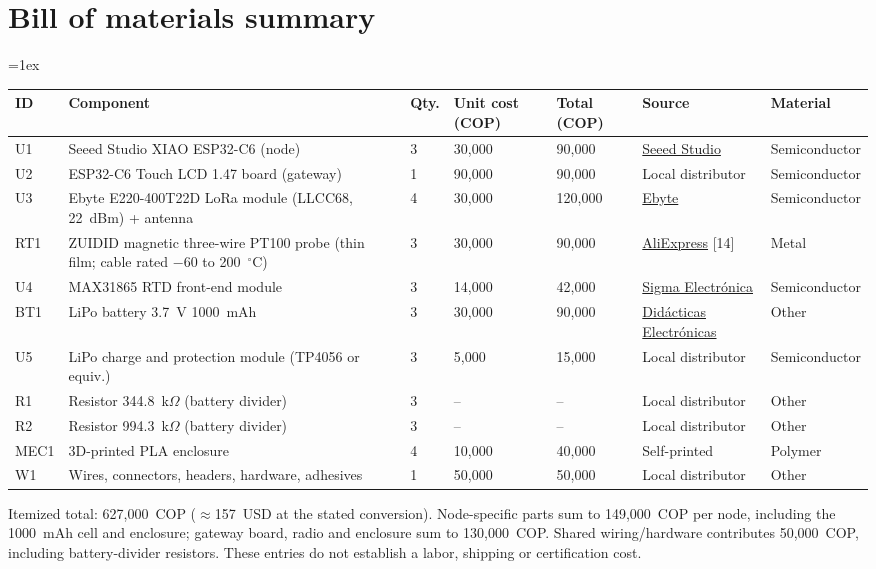 \documentclass[11pt, letterpaper]{article}
\begin{document}
\section{Bill of materials summary}
\vskip 0.2cm
\begingroup\small
\tabulinesep=1ex
\begin{tabu} to \linewidth {|X[0.8,l]|X[1.6,l]|X[0.4,c]|X[0.9,r]|X[0.9,r]|X[1.2,l]|X[1.1,l]|}
\hline
\textbf{ID} & \textbf{Component} & \textbf{Qty.} & \textbf{Unit cost (COP)} & \textbf{Total (COP)} & \textbf{Source} & \textbf{Material} \\\hline
U1 & Seeed Studio XIAO ESP32-C6 (node) & 3 & 30{,}000 & 90{,}000 & \href{https://www.seeedstudio.com/}{Seeed Studio} & Semiconductor \\\hline
U2 & ESP32-C6 Touch LCD 1.47 board (gateway) & 1 & 90{,}000 & 90{,}000 & Local distributor & Semiconductor \\\hline
U3 & Ebyte E220-400T22D LoRa module (LLCC68, 22~dBm) + antenna & 4 & 30{,}000 & 120{,}000 & \href{https://www.cdebyte.com/products/E220-400T22D}{Ebyte} & Semiconductor \\\hline
RT1 & ZUIDID magnetic three-wire PT100 probe (thin film; cable rated $-60$ to 200~$^{\circ}$C) & 3 & 30{,}000 & 90{,}000 & \href{https://www.aliexpress.com/item/1005008619909588.html}{AliExpress} [14] & Metal \\\hline
U4 & MAX31865 RTD front-end module & 3 & 14{,}000 & 42{,}000 & \href{https://www.sigmaelectronica.net/}{Sigma Electr\'onica} & Semiconductor \\\hline
BT1 & LiPo battery 3.7~V 1000~mAh & 3 & 30{,}000 & 90{,}000 & \href{https://www.didacticaselectronicas.com/}{Did\'acticas Electr\'onicas} & Other \\\hline
U5 & LiPo charge and protection module (TP4056 or equiv.) & 3 & 5{,}000 & 15{,}000 & Local distributor & Semiconductor \\\hline
R1 & Resistor 344.8~k$\Omega$ (battery divider) & 3 & -- & -- & Local distributor & Other \\\hline
R2 & Resistor 994.3~k$\Omega$ (battery divider) & 3 & -- & -- & Local distributor & Other \\\hline
MEC1 & 3D-printed PLA enclosure & 4 & 10{,}000 & 40{,}000 & Self-printed & Polymer \\\hline
W1 & Wires, connectors, headers, hardware, adhesives & 1 & 50{,}000 & 50{,}000 & Local distributor & Other \\\hline
\end{tabu}
\endgroup
\vskip 0.2cm
Itemized total: 627{,}000~COP ($\approx$157~USD at the stated conversion). Node-specific parts sum to 149{,}000~COP per node, including the 1000~mAh cell and enclosure; gateway board, radio and enclosure sum to 130{,}000~COP. Shared wiring/hardware contributes 50{,}000~COP, including battery-divider resistors. These entries do not establish a labor, shipping or certification cost.
\end{document}
